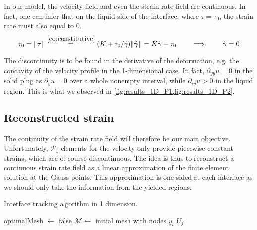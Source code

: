 \documentclass[11 pt]{report}
\begin{document}
In our model, the velocity field and even the strain rate field are continuous. In fact, one can infer that on the liquid side of the interface, where $\tau=\tau_0$, the strain rate must also equal to $0$.
\begin{equation}
    \tau_0 = \|\boldsymbol \tau\| \stackrel{\eqref{eq:constitutive}}{=} (K + \tau_0 / \dot \gamma) \|\boldsymbol{\dot \gamma}\| = K \dot \gamma + \tau_0 \qquad \implies \qquad \dot \gamma = 0
\end{equation}

The discontinuity is to be found in the derivative of the deformation, e.g. the concavity of the velocity profile in the 1-dimensional case. In fact, $\partial_{yy} u = 0$ in the solid plug as $\partial_y u = 0$ over a whole nonempty interval, while $\partial_{yy} u > 0$ in the liquid region. This is what we observed in \cref{fig:results_1D_P1,fig:results_1D_P2}.

\subsection{Reconstructed strain}

The continuity of the strain rate field will therefore be our main objective. Unfortunately, $\mathcal{P}_1$-elements for the velocity only provide piecewise constant strains, which are of course discontinuous. The idea is thus to reconstruct a continuous strain rate field as a linear approximation of the finite element solution at the Gauss points. This approximation is one-sided at each interface as we should only take the information from the yielded regions.

\begin{algorithm}[!b]
    \caption{Interface tracking algorithm in 1 dimension.}
    \label{alg:tacking_1d}
    optimalMesh $\gets$ false\;
    $\mathcal{M} \gets $ initial mesh with nodes $y_i$\;
    \Return $U_j$ 
\end{algorithm}
\end{document}
